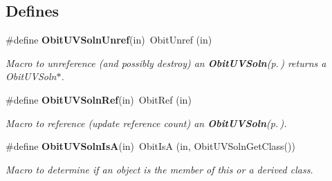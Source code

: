 \subsection*{Defines}
\begin{CompactItemize}
\item 
\#define {\bf Obit\-UVSoln\-Unref}(in)\ Obit\-Unref (in)
\begin{CompactList}\small\item\em Macro to unreference (and possibly destroy) an {\bf Obit\-UVSoln}{\rm (p.\,\pageref{structObitUVSoln})} returns a Obit\-UVSoln$\ast$. \item\end{CompactList}\item 
\#define {\bf Obit\-UVSoln\-Ref}(in)\ Obit\-Ref (in)
\begin{CompactList}\small\item\em Macro to reference (update reference count) an {\bf Obit\-UVSoln}{\rm (p.\,\pageref{structObitUVSoln})}. \item\end{CompactList}\item 
\#define {\bf Obit\-UVSoln\-Is\-A}(in)\ Obit\-Is\-A (in, Obit\-UVSoln\-Get\-Class())
\begin{CompactList}\small\item\em Macro to determine if an object is the member of this or a derived class. \item\end{CompactList}\end{CompactItemize}
